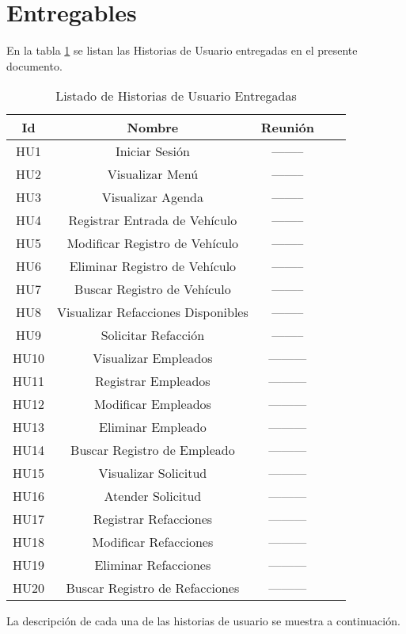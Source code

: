 \section{Entregables}

En la tabla \ref{tab: Listado de Historias de Usuario Entregadas} se listan las Historias de Usuario entregadas en el presente documento.

\begin{table}[h]
	\begin{center}
		\begin{tabular}{|c|c|c|c|c|}
			\hline 
			\textbf{Id} & \textbf{Nombre} & \textbf{Reunión} \\ 
			\hline 
			HU1  & Iniciar Sesión  & --------  \\
			HU2  & Visualizar Menú  & --------  \\ 
			HU3  & Visualizar Agenda  & --------  \\
			HU4  & Registrar Entrada de Vehículo  & --------  \\
			HU5  & Modificar Registro de Vehículo  & --------  \\
			HU6  & Eliminar Registro de Vehículo  & --------  \\
			HU7  & Buscar Registro de Vehículo  & --------  \\
			HU8  & Visualizar Refacciones Disponibles  & --------  \\
			HU9  & Solicitar Refacción  & --------  \\
			HU10 & Visualizar Empleados & --------- \\
			HU11 & Registrar Empleados & --------- \\
			HU12 & Modificar Empleados & --------- \\
			HU13 & Eliminar Empleado & --------- \\
			HU14 & Buscar Registro de Empleado & --------- \\
			HU15 & Visualizar Solicitud & --------- \\
			HU16 & Atender Solicitud & --------- \\
			HU17 & Registrar Refacciones & --------- \\
			HU18 & Modificar Refacciones & --------- \\
			HU19 & Eliminar Refacciones & --------- \\
			HU20 & Buscar Registro de Refacciones & --------- \\
			
			\hline 
		\end{tabular}
	\end{center}
	\label{tab: Listado de Historias de Usuario Entregadas}
	\caption{Listado de Historias de Usuario Entregadas}
\end{table}

La descripción de cada una de las historias de usuario se muestra a continuación.